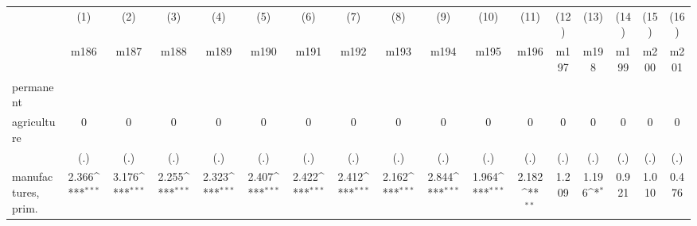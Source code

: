 {
\def\sym#1{\ifmmode^{#1}\else\(^{#1}\)\fi}
\begin{tabular}{l*{16}{c}}
\hline\hline
                    &\multicolumn{1}{c}{(1)}&\multicolumn{1}{c}{(2)}&\multicolumn{1}{c}{(3)}&\multicolumn{1}{c}{(4)}&\multicolumn{1}{c}{(5)}&\multicolumn{1}{c}{(6)}&\multicolumn{1}{c}{(7)}&\multicolumn{1}{c}{(8)}&\multicolumn{1}{c}{(9)}&\multicolumn{1}{c}{(10)}&\multicolumn{1}{c}{(11)}&\multicolumn{1}{c}{(12)}&\multicolumn{1}{c}{(13)}&\multicolumn{1}{c}{(14)}&\multicolumn{1}{c}{(15)}&\multicolumn{1}{c}{(16)}\\
                    &\multicolumn{1}{c}{m186}&\multicolumn{1}{c}{m187}&\multicolumn{1}{c}{m188}&\multicolumn{1}{c}{m189}&\multicolumn{1}{c}{m190}&\multicolumn{1}{c}{m191}&\multicolumn{1}{c}{m192}&\multicolumn{1}{c}{m193}&\multicolumn{1}{c}{m194}&\multicolumn{1}{c}{m195}&\multicolumn{1}{c}{m196}&\multicolumn{1}{c}{m197}&\multicolumn{1}{c}{m198}&\multicolumn{1}{c}{m199}&\multicolumn{1}{c}{m200}&\multicolumn{1}{c}{m201}\\
\hline
permanent           &                     &                     &                     &                     &                     &                     &                     &                     &                     &                     &                     &                     &                     &                     &                     &                     \\
agriculture         &           0         &           0         &           0         &           0         &           0         &           0         &           0         &           0         &           0         &           0         &           0         &           0         &           0         &           0         &           0         &           0         \\
                    &         (.)         &         (.)         &         (.)         &         (.)         &         (.)         &         (.)         &         (.)         &         (.)         &         (.)         &         (.)         &         (.)         &         (.)         &         (.)         &         (.)         &         (.)         &         (.)         \\
[1em]
manufactures, prim. &       2.366\sym{***}&       3.176\sym{***}&       2.255\sym{***}&       2.323\sym{***}&       2.407\sym{***}&       2.422\sym{***}&       2.412\sym{***}&       2.162\sym{***}&       2.844\sym{***}&       1.964\sym{***}&       2.182\sym{**} &       1.209         &       1.196\sym{*}  &       0.921         &       1.010         &       0.476         \\

\end{tabular}}
